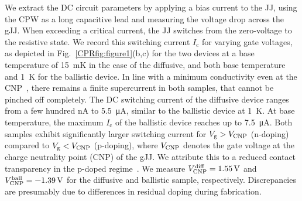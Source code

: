 We extract the DC circuit parameters by applying a bias current to the JJ, using the CPW as a long capacitive lead and measuring the voltage drop across the gJJ.
%
When exceeding a critical current, the JJ switches from the zero-voltage to the resistive state.
%
We record this switching current $I_\text{c}$ for varying gate voltages, as depicted in Fig.~\ref{CPRfig:figure1}(b,c) for the two devices at a base temperature of \SI{15}{\milli\kelvin} in the case of the diffusive, and both base temperature and \SI{1}{\kelvin} for the ballistic device.
%
In line with a minimum conductivity even at the CNP~\cite{katsnelsonZitterbewegungChiralityMinimal2006, zieglerRobustTransportProperties2006, tworzydloSubPoissonianShotNoise2006,titovJosephsonEffectBallistic2006b}, there remains a finite supercurrent in both samples, that cannot be pinched off completely.
%
The DC switching current of the diffusive device ranges from a few hundred \si{\nano\ampere} to \SI{5.5}{\micro\ampere}, similar to the ballistic device at \SI{1}{\kelvin}.
%
At base temperature, the maximum $I_\text{c}$ of the ballistic device reaches up to \SI{7.5}{\micro\ampere}.
%
Both samples exhibit significantly larger switching current for $V_\text{g}>V_{\rm CNP}$ (n-doping) compared to $V_\text{g}<V_{\rm CNP}$ (p-doping), where $V_{\rm CNP}$ denotes the gate voltage at the charge neutrality point (CNP) of the gJJ.
%
We attribute this to a reduced contact transparency in the p-doped regime~\cite{schmidtBallisticGrapheneSuperconducting2018}.
%
We measure $V_{\rm CNP}^{\rm diff}=\SI{1.55}{\volt}$ and $V_{\rm CNP}^{\rm ball}=\SI{-1.39}{\volt}$ for the diffusive and ballistic sample, respectively.
%
Discrepancies are presumably due to differences in residual doping during fabrication.

